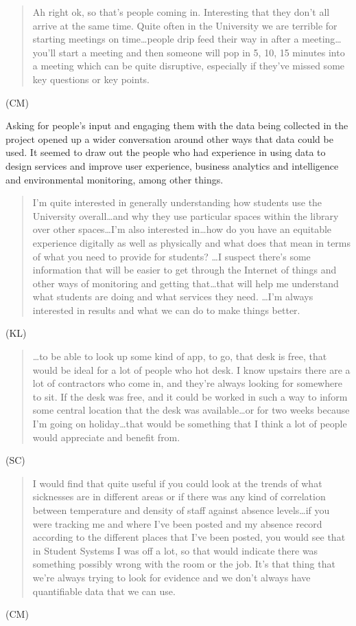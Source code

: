 \begin{quote}Ah right ok, so that’s people coming in. Interesting that they don’t
all arrive at the same time. Quite often in the University we are
terrible for starting meetings on time\ldots people drip feed their way in
after a meeting\ldots you’ll start a meeting and then someone will pop in
5, 10, 15 minutes into a meeting which can be quite disruptive,
especially if they’ve missed some key questions or key points.\end{quote} (CM)

Asking for people’s input and engaging them with the data being
collected in the project opened up a wider conversation around other
ways that data could be used. It seemed to draw out the people who had
experience in using data to design services and improve user
experience, business analytics and intelligence and environmental
monitoring, among other things. 

\begin{quote}I’m quite interested in generally understanding how students use the
University overall\ldots and why they use particular spaces within the
library over other spaces\ldots I’m also interested in\ldots how do you have an
equitable experience digitally as well as physically and what does
that mean in terms of what you need to provide for students? \ldots  I
suspect there’s some information that will be easier to get through
the Internet of things and other ways of monitoring and getting
that\ldots that will help me understand what students are doing and what
services they need. \ldots  I’m always interested in results and what we can
do to make things better.
\end{quote}
(KL) 

\begin{quote}\ldots to be able to look up some kind of app, to go, that desk is free,
that would be ideal for a lot of people who hot desk. I know upstairs
there are a lot of contractors who come in, and they’re always looking
for somewhere to sit. If the desk was free, and it could be worked in
such a way to inform some central location that the desk was
available\ldots or for two weeks because I’m going on holiday\ldots that would be
something that I think a lot of people would appreciate and benefit
from.
\end{quote}
(SC) 

\begin{quote}I would find that quite useful if you could look at the trends of
what sicknesses are in different areas or if there was any kind of
correlation between temperature and density of staff against absence
levels\ldots if you were tracking me and where I’ve been posted and my
absence record according to the different places that I’ve been
posted, you would see that in Student Systems I was off a lot, so that
would indicate there was something possibly wrong with the room or the
job. It’s that thing that we’re always trying to look for evidence and
we don’t always have quantifiable data that we can use.
\end{quote}
(CM) 

